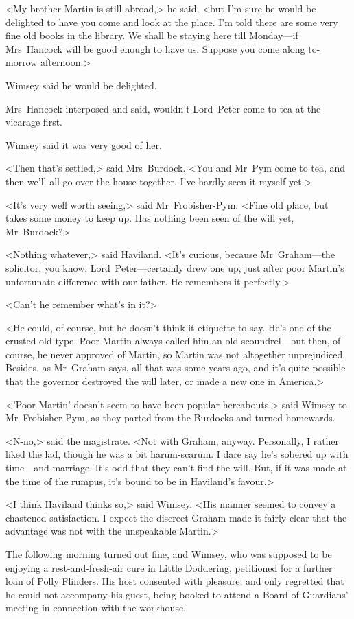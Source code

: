 <My brother Martin is still abroad,> he said, <but I'm sure he would be delighted to have you come and look at the place. I'm told there are some very fine old books in the library. We shall be staying here till Monday—if Mrs~Hancock will be good enough to have us. Suppose you come along to-morrow afternoon.>

Wimsey said he would be delighted.

Mrs~Hancock interposed and said, wouldn't Lord~Peter come to tea at the vicarage first.

Wimsey said it was very good of her.

<Then that's settled,> said Mrs~Burdock. <You and Mr~Pym come to tea, and then we'll all go over the house together. I've hardly seen it myself yet.>

<It's very well worth seeing,> said Mr~Frobisher-Pym. <Fine old place, but takes some money to keep up. Has nothing been seen of the will yet, Mr~Burdock?>

<Nothing whatever,> said Haviland. <It's curious, because Mr~Graham—the solicitor, you know, Lord~Peter—certainly drew one up, just after poor Martin's unfortunate difference with our father. He remembers it perfectly.>

<Can't he remember what's in it?>

<He could, of course, but he doesn't think it etiquette to say. He's one of the crusted old type. Poor Martin always called him an old scoundrel—but then, of course, he never approved of Martin, so Martin was not altogether unprejudiced. Besides, as Mr~Graham says, all that was some years ago, and it's quite possible that the governor destroyed the will later, or made a new one in America.>

<'Poor Martin' doesn't seem to have been popular hereabouts,> said Wimsey to Mr~Frobisher-Pym, as they parted from the Burdocks and turned homewards.

<N-no,> said the magistrate. <Not with Graham, anyway. Personally, I rather liked the lad, though he was a bit harum-scarum. I dare say he's sobered up with time—and marriage. It's odd that they can't find the will. But, if it was made at the time of the rumpus, it's bound to be in Haviland's favour.>

<I think Haviland thinks so,> said Wimsey. <His manner seemed to convey a chastened satisfaction. I expect the discreet Graham made it fairly clear that the advantage was not with the unspeakable Martin.>

The following morning turned out fine, and Wimsey, who was supposed to be enjoying a rest-and-fresh-air cure in Little Doddering, petitioned for a further loan of Polly Flinders. His host consented with pleasure, and only regretted that he could not accompany his guest, being booked to attend a Board of Guardians' meeting in connection with the workhouse.

